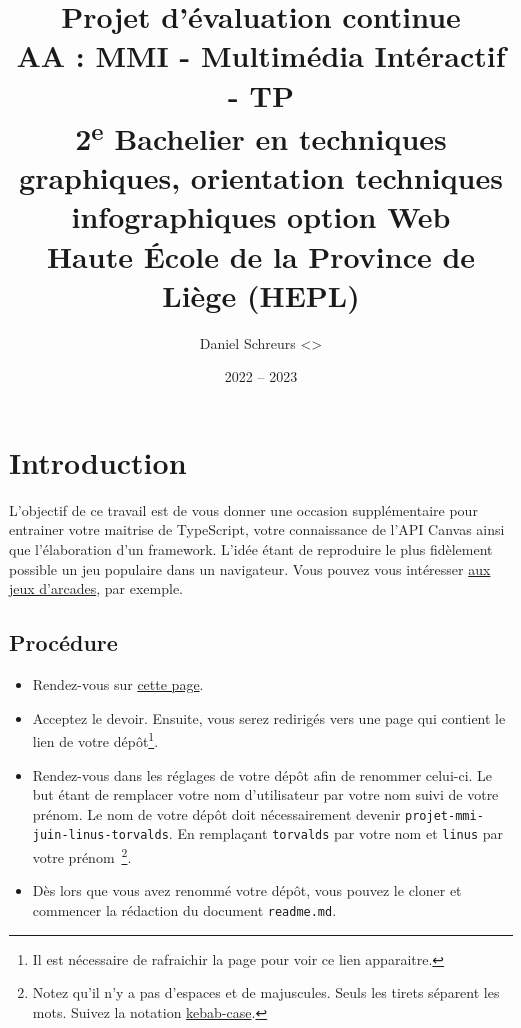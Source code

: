 \documentclass[11pt, a4paper]{article}
\title{Projet d'évaluation continue\\[3mm]AA : MMI - Multimédia Intéractif - TP\\[3mm]\large 2\textsuperscript{e} Bachelier en techniques graphiques, orientation techniques infographiques option Web\\Haute École de la Province de Liège (HEPL)}
\author{Daniel Schreurs \textless\emaildaniel\textgreater}
\date{2022 -- 2023}
\begin{document}
\pagestyle{mypagestyle}

\maketitle

\section{Introduction}

L’objectif de ce travail est de vous donner une occasion supplémentaire pour entrainer votre maitrise de TypeScript, votre connaissance de l'API Canvas ainsi que l'élaboration d'un framework. L'idée étant de reproduire le plus fidèlement possible un jeu populaire dans un navigateur. Vous pouvez vous intéresser \href{https://archive.org/details/internetarcade}{aux jeux d'arcades}, par exemple.

\subsection{Procédure}
\label{procedure}

\begin{itemize}
  \item Rendez-vous sur \href{https://classroom.github.com/a/ub8pvaIs}{cette page}.
  \item Acceptez le devoir. Ensuite, vous serez redirigés vers une page qui contient le lien de votre dépôt\footnote{Il est nécessaire de rafraichir la page pour voir ce lien apparaitre.}.
  \item Rendez-vous dans les réglages de votre dépôt afin de renommer celui-ci. Le but étant de remplacer votre nom d'utilisateur par votre nom suivi de votre prénom. Le nom de votre dépôt doit nécessairement devenir \verb!projet-mmi-juin-linus-torvalds!. En remplaçant \verb!torvalds! par votre nom et \verb!linus! par votre prénom~\footnote{Notez qu’il n'y a pas d'espaces et de majuscules. Seuls les tirets séparent les mots. Suivez la notation \href{https://en.wiktionary.org/wiki/kebab_case}{kebab-case}.}.
  \item Dès lors que vous avez renommé votre dépôt, vous pouvez le cloner et commencer la rédaction du document \verb!readme.md!.
\end{itemize}
\vspace*{2cm}
\begin{figure}[htbp]
  \centering
  
\end{figure}
\end{document}
